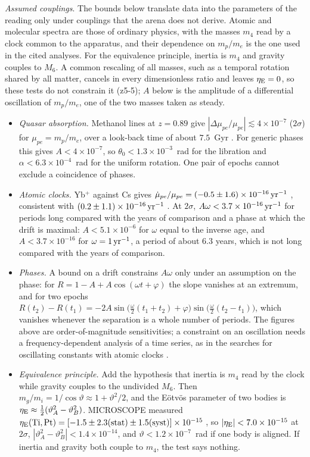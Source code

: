 \emph{Assumed couplings}. The bounds below translate data into the parameters of the reading only under couplings that the arena
does not derive. Atomic and molecular spectra are those of ordinary physics, with the masses $m_4$ read by a clock common to the apparatus, and
their dependence on $m_p/m_e$ is the one used in the cited analyses. For the equivalence principle, inertia is $m_4$ and gravity couples to
$M_6$. A common rescaling of all masses, such as a temporal rotation shared by all matter, cancels in every dimensionless ratio and leaves
$\eta_{\rm E}=0$, so these tests do not constrain it (z5-5); $A$ below is the amplitude of a differential oscillation of $m_p/m_e$, one of the two
masses taken as steady.
\begin{itemize}
\item \emph{Quasar absorption.} Methanol lines at $z=0.89$ give $|\Delta\mu_{pe}/\mu_{pe}|\lesssim4\times10^{-7}$ ($2\sigma$) for
$\mu_{pe}=m_p/m_e$, over a look-back time of about $7.5$~Gyr \cite{Kanekar15}. For generic phases this gives $A<4\times10^{-7}$, so
$\theta_0<1.3\times10^{-3}$~rad for the libration and $\alpha<6.3\times10^{-4}$~rad for the uniform rotation. One pair of epochs cannot exclude a
coincidence of phases.
\item \emph{Atomic clocks.} Yb$^+$ against Cs gives $\dot\mu_{pe}/\mu_{pe}=(-0.5\pm1.6)\times10^{-16}\,{\rm yr^{-1}}$ \cite{Huntemann14}, consistent with
$(0.2\pm1.1)\times10^{-16}\,{\rm yr^{-1}}$ \cite{Godun14}. At $2\sigma$, $A\omega<3.7\times10^{-16}\,{\rm yr^{-1}}$ for periods long compared with the
years of comparison and a phase at which the drift is maximal: $A<5.1\times10^{-6}$ for $\omega$ equal to the inverse age, and $A<3.7\times10^{-16}$ for
$\omega=1\,{\rm yr^{-1}}$, a period of about $6.3$ years, which is not long compared with the years of comparison.
\item \emph{Phases.} A bound on a drift constrains $A\omega$ only under an assumption on the phase: for $R=1-A+A\cos(\omega t+\varphi)$ the slope vanishes
at an extremum, and for two epochs $R(t_2)-R(t_1)=-2A\sin\bigl(\tfrac\omega2(t_1+t_2)+\varphi\bigr)\sin\bigl(\tfrac\omega2(t_2-t_1)\bigr)$, which vanishes whenever the
separation is a whole number of periods. The figures above are order-of-magnitude sensitivities; a constraint on an oscillation needs a
frequency-dependent analysis of a time series, as in the searches for oscillating constants with atomic clocks \cite{VanTilburg15}.
\item \emph{Equivalence principle.} Add the hypothesis that inertia is $m_4$ read by the clock while gravity couples to the undivided $M_6$. Then
$m_g/m_i=1/\cos\vartheta\approx1+\vartheta^2/2$, and the E\"otv\"os parameter of two bodies is $\eta_{\rm E}\approx\tfrac12(\vartheta_A^2-\vartheta_B^2)$.
MICROSCOPE measured $\eta_{\rm E}({\rm Ti},{\rm Pt})=[-1.5\pm2.3({\rm stat})\pm1.5({\rm syst})]\times10^{-15}$ \cite{Touboul22}, so $|\eta_{\rm E}|<7.0\times10^{-15}$
at $2\sigma$, $|\vartheta_A^2-\vartheta_B^2|<1.4\times10^{-14}$, and $\vartheta<1.2\times10^{-7}$~rad if one body is aligned. If inertia and gravity
both couple to $m_4$, the test says nothing.
\end{itemize}


